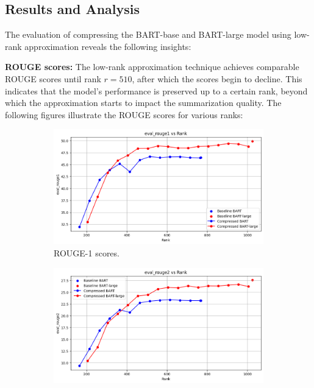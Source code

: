     \subsection{Results and Analysis}
    The evaluation of compressing the BART-base and BART-large model using low-rank approximation reveals the following insights:
    
    \textbf{ROUGE scores:} The low-rank approximation technique achieves comparable ROUGE scores until rank \(r = 510\), after which the scores begin to decline. This indicates that the model's performance is preserved up to a certain rank, beyond which the approximation starts to impact the summarization quality. The following figures illustrate the ROUGE scores for various ranks:
    
    \begin{figure}[H]
        \centering
        \begin{subfigure}[b]{0.45\textwidth}
            \centering
            \includegraphics[width=\textwidth]{figs/05:05/Rouge1.png}
            \caption{ROUGE-1 scores.}
            \label{fig:sub1}
        \end{subfigure}
        \hfill
        \begin{subfigure}[b]{0.45\textwidth}
            \centering
            \includegraphics[width=\textwidth]{figs/05:05/Rouge2.png}

\end{subfigure}
\end{figure}
